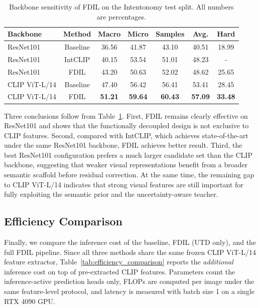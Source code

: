 \begin{table}[t]
\centering
\caption{Backbone sensitivity of FDIL on the Intentonomy test split. All numbers are percentages.}
\label{tab:backbone_ablation}
\begin{tabular}{lcccccc}
\hline
Backbone & Method & Macro & Micro & Samples & Avg. & Hard \\
\hline
ResNet101 \cite{he_deep_2016} & Baseline & 36.56 & 41.87 & 43.10 & 40.51 & 18.99 \\
ResNet101 \cite{he_deep_2016} & IntCLIP \cite{leonardis_synergy_2025} & 40.15 & 53.54 & 51.01 & 48.23 & - \\
ResNet101 \cite{he_deep_2016}& FDIL & 43.20 & 50.63 & 52.02 & 48.62 & 25.65 \\
\hline
CLIP ViT-L/14 \cite{radford_learning_2021} & Baseline & 47.40 & 56.42 & 56.41 & 53.41 & 28.45 \\
CLIP ViT-L/14 \cite{radford_learning_2021}& FDIL & \textbf{51.21} & \textbf{59.64} & \textbf{60.43} & \textbf{57.09} & \textbf{33.48} \\
\hline
\end{tabular}
\end{table}

Three conclusions follow from Table~\ref{tab:backbone_ablation}. First, FDIL remains clearly effective on ResNet101 and shows that the functionally decoupled design is not exclusive to CLIP features. Second, compared with IntCLIP, which achieves state-of-the-art under the same ResNet101 backbone, FDIL achieves better result. Third, the best ResNet101 configuration prefers a much larger candidate set than the CLIP backbone, suggesting that weaker visual representations benefit from a broader semantic scaffold before residual correction. At the same time, the remaining gap to CLIP ViT-L/14 indicates that strong visual features are still important for fully exploiting the semantic prior and the uncertainty-aware teacher.

\subsection{Efficiency Comparison}

Finally, we compare the inference cost of the baseline, FDIL (UTD only), and the full FDIL pipeline. Since all three methods share the same frozen CLIP ViT-L/14 feature extractor, Table~\ref{tab:efficiency_comparison} reports the \emph{additional} inference cost on top of pre-extracted CLIP features. Parameters count the inference-active prediction heads only, FLOPs are computed per image under the same feature-level protocol, and latency is measured with batch size 1 on a single RTX 4090 GPU.

